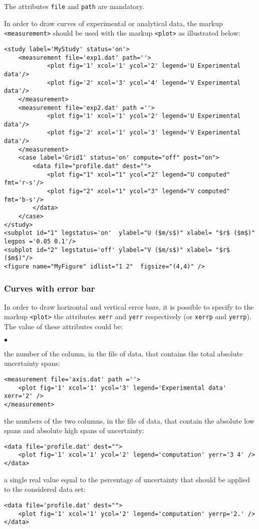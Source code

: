\documentclass[a4paper,10pt,twoside]{csshortdoc}
\begin{document}
The attributes \texttt{file} and \texttt{path} are mandatory.

In order to draw curves of experimental or analytical data, the markup \texttt{<measurement>}
should be used with the markup \texttt{<plot>} as illustrated below:

\small
\begin{verbatim}
<study label='MyStudy' status='on'>
    <measurement file='exp1.dat' path=''>
            <plot fig='1' xcol='1' ycol='2' legend='U Experimental data'/>
            <plot fig='2' xcol='3' ycol='4' legend='V Experimental data'/>
    </measurement>
    <measurement file='exp2.dat' path =''>
            <plot fig='1' xcol='1' ycol='2' legend='U Experimental data'/>
            <plot fig='2' xcol='1' ycol='3' legend='V Experimental data'/>
    </measurement>
    <case label='Grid1' status='on' compute="off" post="on">
        <data file="profile.dat" dest="">
            <plot fig="1" xcol="1" ycol="2" legend="U computed" fmt='r-s'/>
            <plot fig="2" xcol="1" ycol="3" legend="V computed" fmt='b-s'/>
        </data>
    </case>
</study>
<subplot id="1" legstatus='on'  ylabel="U ($m/s$)" xlabel= "$r$ ($m$)" legpos ='0.05 0.1'/>
<subplot id="2" legstatus='off' ylabel="V ($m/s$)" xlabel= "$r$ ($m$)"/>
<figure name="MyFigure" idlist="1 2"  figsize="(4,4)" />
\end{verbatim}
\normalsize

\subsubsection{Curves with error bar}\label{sec:err}

In order to draw horizontal and vertical error bars, it is possible to
specify to the markup \texttt{<plot>} the attributes \texttt{xerr} and
\texttt{yerr} respectively (or \texttt{xerrp} and \texttt{yerrp}). The
value of these attributes could be:
\begin{list}{$\bullet$}{}
\item the number of the column, in the file of data, that contains the total
absolute uncertainty spans:
\small
\begin{verbatim}
<measurement file='axis.dat' path =''>
    <plot fig='1' xcol='1' ycol='3' legend='Experimental data' xerr='2' />
</measurement>
\end{verbatim}
\normalsize
\item the numbers of the two columns, in the file of data, that contain the
absolute low spans and absolute high spans of uncertainty:
\small
\begin{verbatim}
<data file='profile.dat' dest="">
    <plot fig='1' xcol='1' ycol='2' legend='computation' yerr='3 4' />
</data>
\end{verbatim}
\normalsize
\item a single real value equal to the percentage of uncertainty that should be
applied to the considered data set:
\small
\begin{verbatim}
<data file='profile.dat' dest="">
    <plot fig='1' xcol='1' ycol='2' legend='computation' yerrp='2.' />
</data>
\end{verbatim}
\normalsize
\end{list}
\end{document}
